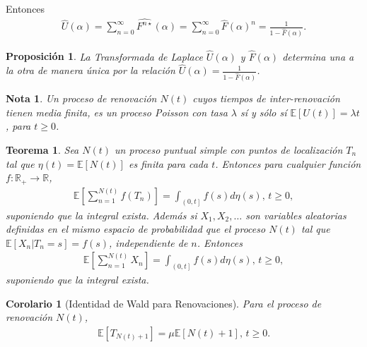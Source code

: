 \documentclass{article}
\newtheorem{Teo}{Teorema}[section]
\newtheorem{Note}{Nota}[section]
\newtheorem{Prop}{Proposición}[section]
\newtheorem{Cor}{Corolario}[section]
\newcommand{\rea}{\mathbb{R}}
\newcommand{\esp}{\mathbb{E}}
\numberwithin{equation}{section}
\begin{document}
Entonces
\begin{eqnarray}
\hat{U}\left(\alpha\right)=\sum_{n=0}^{\infty}\hat{F^{n\star}}\left(\alpha\right)=\sum_{n=0}^{\infty}\hat{F}\left(\alpha\right)^{n}=\frac{1}{1-\hat{F}\left(\alpha\right)}.
\end{eqnarray}

\begin{Prop}
La Transformada de Laplace $\hat{U}\left(\alpha\right)$ y $\hat{F}\left(\alpha\right)$ determina una a la otra de manera \'unica por la relaci\'on $\hat{U}\left(\alpha\right)=\frac{1}{1-\hat{F}\left(\alpha\right)}$.
\end{Prop}

\begin{Note}
Un proceso de renovaci\'on $N\left(t\right)$ cuyos tiempos de inter-renovaci\'on tienen media finita, es un proceso Poisson con tasa $\lambda$ s\'i y s\'olo s\'i $\esp\left[U\left(t\right)\right]=\lambda t$, para $t\geq0$.
\end{Note}

\begin{Teo}
Sea $N\left(t\right)$ un proceso puntual simple con puntos de localizaci\'on $T_{n}$ tal que $\eta\left(t\right)=\esp\left[N\left(t\right)\right]$ es finita para cada $t$. Entonces para cualquier funci\'on $f:\rea_{+}\rightarrow\rea$,
\begin{eqnarray}
\esp\left[\sum_{n=1}^{N\left(t\right)}f\left(T_{n}\right)\right]=\int_{\left(0,t\right]}f\left(s\right)d\eta\left(s\right)\textrm{,  }t\geq0,
\end{eqnarray}
suponiendo que la integral exista. Adem\'as si $X_{1},X_{2},\ldots$ son variables aleatorias definidas en el mismo espacio de probabilidad que el proceso $N\left(t\right)$ tal que $\esp\left[X_{n}|T_{n}=s\right]=f\left(s\right)$, independiente de $n$. Entonces
\begin{eqnarray}
\esp\left[\sum_{n=1}^{N\left(t\right)}X_{n}\right]=\int_{\left(0,t\right]}f\left(s\right)d\eta\left(s\right)\textrm{,  }t\geq0,
\end{eqnarray} 
suponiendo que la integral exista. 
\end{Teo}

\begin{Cor}[Identidad de Wald para Renovaciones]
Para el proceso de renovaci\'on $N\left(t\right)$,
\begin{eqnarray}
\esp\left[T_{N\left(t\right)+1}\right]=\mu\esp\left[N\left(t\right)+1\right]\textrm{,  }t\geq0.
\end{eqnarray}  
\end{Cor}
\end{document}
